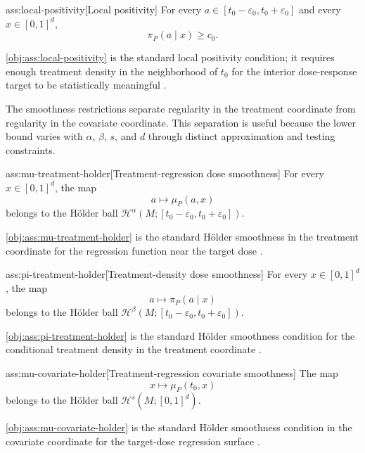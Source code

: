 \documentclass[11pt]{article}
\begin{document}
\begin{assumptionv}{ass:local-positivity}[Local positivity]
For every \(a\in[t_0-\varepsilon_0,t_0+\varepsilon_0]\) and every \(x\in[0,1]^d\),
\[
\pi_P(a\mid x)\ge c_0.
\]
\end{assumptionv}

\cref{obj:ass:local-positivity} is the standard local positivity condition; it requires enough treatment density in the neighborhood of \(t_0\) for the interior dose-response target to be statistically meaningful \citep{bonvini2022}.

The smoothness restrictions separate regularity in the treatment coordinate from regularity in the covariate coordinate. This separation is useful because the lower bound varies with \(\alpha\), \(\beta\), \(s\), and \(d\) through distinct approximation and testing constraints.

\begin{assumptionv}{ass:mu-treatment-holder}[Treatment-regression dose smoothness]
For every \(x\in[0,1]^d\), the map
\[
a\longmapsto \mu_P(a,x)
\]
belongs to the Hölder ball \(\mathcal H^\alpha(M;[t_0-\varepsilon_0,t_0+\varepsilon_0])\).
\end{assumptionv}

\cref{obj:ass:mu-treatment-holder} is the standard Hölder smoothness in the treatment coordinate for the regression function near the target dose \citep{tsybakov2009}.

\begin{assumptionv}{ass:pi-treatment-holder}[Treatment-density dose smoothness]
For every \(x\in[0,1]^d\), the map
\[
a\longmapsto \pi_P(a\mid x)
\]
belongs to the Hölder ball \(\mathcal H^\beta(M;[t_0-\varepsilon_0,t_0+\varepsilon_0])\).
\end{assumptionv}

\cref{obj:ass:pi-treatment-holder} is the standard Hölder smoothness condition for the conditional treatment density in the treatment coordinate \citep{bonvini2022}.

\begin{assumptionv}{ass:mu-covariate-holder}[Treatment-regression covariate smoothness]
The map
\[
x\longmapsto \mu_P(t_0,x)
\]
belongs to the Hölder ball \(\mathcal H^s(M;[0,1]^d)\).
\end{assumptionv}

\cref{obj:ass:mu-covariate-holder} is the standard Hölder smoothness condition in the covariate coordinate for the target-dose regression surface \citep{tsybakov2009}.
\end{document}
